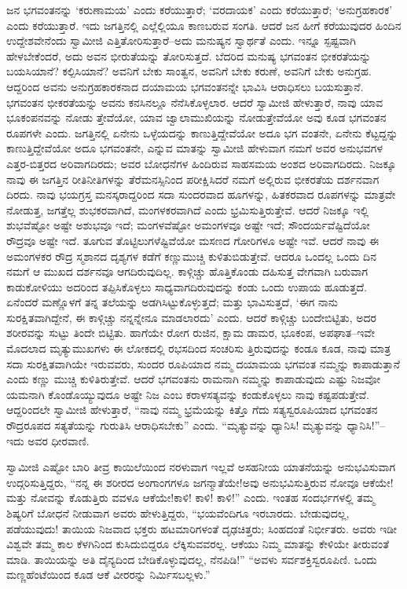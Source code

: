 ಜನ ಭಗವಂತನನ್ನು ‘ಕರುಣಾಮಯ’ ಎಂದು ಕರೆಯುತ್ತಾರೆ; ‘ವರದಾಯಕ’ ಎಂದು ಕರೆಯುತ್ತಾರೆ; ‘ಅನುಗ್ರಹಕಾರಕ’ ಎಂದು ಕರೆಯುತ್ತಾರೆ. ಇದು ಜಗತ್ತಿನಲ್ಲಿ ಎಲ್ಲೆಲ್ಲಿಯೂ ಕಾಣಬರುವ ಸಂಗತಿ. ಆದರೆ ಜನ ಹೀಗೆ ಕರೆಯುವುದರ ಹಿಂದಿನ ಉದ್ದೇಶವೇನೆಂದು ಸ್ವಾಮೀಜಿ ಎತ್ತಿತೋರಿಸುತ್ತಾರೆ–ಅದು ಮನುಷ್ಯನ ಸ್ವಾರ್ಥತೆ ಎಂದು. ಇನ್ನೂ ಸ್ಪಷ್ಟವಾಗಿ ಹೇಳಬೇಕೆಂದರೆ, ಅದು ಅವನ ಭೀರುತೆಯನ್ನು ತೋರಿಸುತ್ತದೆ. ಬೆದರಿದ ಮನುಷ್ಯ ಭಗವಂತನ ಭೀಕರತೆಯನ್ನು ಬಯಸಿಯಾನೆ? ಕಲ್ಪಿಸಿಯಾನೆ? ಅವನಿಗೆ ಬೇಕು ಸಾಂತ್ವನ, ಅವನಿಗೆ ಬೇಕು ಕರುಣೆ, ಅವನಿಗೆ ಬೇಕು ಅನುಗ್ರಹ. ಆದ್ದರಿಂದ ಅವನು ಅನುಗ್ರಹಕಾರಕನಾದ ದಯಾಮಯ ಭಗವಂತನನ್ನೇ ಭಾವಿಸಿ ಆರಾಧಿಸಲು ಬಯಸುತ್ತಾನೆ. ಭಗವಂತನ ಭೀಕರತೆಯನ್ನು ಅವನು ಕನಸಿನಲ್ಲೂ ನೆನೆಸಿಕೊಳ್ಳಲಾರ. ಆದರೆ ಸ್ವಾಮೀಜಿ ಹೇಳುತ್ತಾರೆ, ನಾವು ಯಾವ ಭೂಕಂಪನವನ್ನು ನೋಡು ತ್ತೇವೆಯೋ, ಯಾವ ಜ್ವಾಲಾಮುಖಿಯನ್ನು ನೋಡುತ್ತೇವೆಯೋ ಅವು ಕೂಡ ಭಗವಂತನ ರೂಪಗಳೇ ಎಂದು. ಜಗತ್ತಿನಲ್ಲಿ ಏನೇನು ಒಳ್ಳೆಯದನ್ನು ಕಾಣುತ್ತಿದ್ದೇವೆಯೋ ಅದೂ ಭಗ ವಂತನೇ, ಏನೇನು ಕೆಟ್ಟದ್ದನ್ನು ಕಾಣುತ್ತಿದ್ದೇವೆಯೋ ಅದೂ ಭಗವಂತನೇ, ಎನ್ನುವ ಮಾತನ್ನು ಸ್ವಾಮೀಜಿ ಹೇಳುವಾಗ ನಮಗೆ ಅವರ ಅನುಭವಗಳ ಎತ್ತರ-ಬಿತ್ತರದ ಅರಿವಾಗದಿರದು; ಅವರ ಬೋಧನೆಗಳ ಹಿಂದಿರುವ ಸಾಹಸಮಯ ಅಂಶದ ಅರಿವಾಗದಿರದು. ನಿಜಕ್ಕೂ ನಾವು ಈ ಜಗತ್ತಿನ ರೀತಿನೀತಿಗಳನ್ನು ತೆರೆಮನಸ್ಸಿನಿಂದ ಪರೀಕ್ಷಿಸಿದರೆ ನಮಗೆ ಅಲ್ಲಿರುವ ಭೀಕರತೆಯ ದರ್ಶನವಾಗ ದಿರದು. ನಾವು ಭಯಗ್ರಸ್ತ ಮನಸ್ಕರಾದ್ದರಿಂದ ಸದಾ ಸುಂದರವಾದ ಹೂಗಳನ್ನು, ಹಿತಕರವಾದ ರೂಪಗಳನ್ನು ಮಾತ್ರವೇ ನೋಡುತ್ತ, ಜಗತ್ತೆಲ್ಲ ಶುಭಕರವಾಗಿದೆ, ಮಂಗಳಕರವಾಗಿದೆ ಎಂದು ಭ್ರಮಿಸುತ್ತಿರುತ್ತೇವೆ. ಆದರೆ ನಿಜಕ್ಕೂ ಇಲ್ಲಿ ಶುಭವೆಷ್ಟೋ ಅಷ್ಟೇ ಅಶುಭವೂ ಇದೆ; ಮಂಗಳವೆಷ್ಟೋ ಅಮಂಗಳವೂ ಅಷ್ಟೇ ಇದೆ; ಸೌಂದರ್ಯವೆಷ್ಟಿದೆಯೋ ರೌದ್ರವೂ ಅಷ್ಟೇ ಇದೆ. ತೂಗುವ ತೊಟ್ಟಿಲುಗಳೆಷ್ಟಿವೆಯೋ ಮಸಣದ ಗೋರಿಗಳೂ ಅಷ್ಟೇ ಇವೆ. ಆದರೆ ನಾವು ಈ ಅಮಂಗಳಕರ ರೌದ್ರ ಸ್ಮಶಾನದ ದೃಶ್ಯಗಳ ಕಡೆಗೆ ಕಣ್ಣುಮುಚ್ಚಿ ಕುಳಿತುಬಿಡುತ್ತೇವೆ. ಆದರೂ ಒಂದಲ್ಲ ಒಂದು ದಿನ ನಮಗೆ ಆ ಮುಖದ ದರ್ಶನವೂ ಆಗದಿರುವುದಿಲ್ಲ. ಕಾಳ್ಗಿಚ್ಚು ಹೊತ್ತಿಕೊಂಡು ದಹಿಸುತ್ತ ವೇಗವಾಗಿ ಬರುವಾಗ ಕಾಡುಕೋಳಿಯು ಅದರಿಂದ ತಪ್ಪಿಸಿಕೊಳ್ಳಲು ಸಾಧ್ಯವಾಗದಿರುವುದನ್ನು ಕಂಡು ಒಂದು ಉಪಾಯ ಹೂಡುತ್ತದೆ. ಏನೆಂದರೆ ಮಣ್ಣೊಳಗೆ ತನ್ನ ತಲೆಯನ್ನು ಅಡಗಿಸಿಟ್ಟುಕೊಳ್ಳುತ್ತದೆ; ಮತ್ತು ಭಾವಿಸುತ್ತದೆ, ‘ಈಗ ನಾನು ಸುರಕ್ಷಿತವಾಗಿದ್ದೇನೆ, ಈ ಕಾಳ್ಗಿಚ್ಚು ನನ್ನನ್ನೇನೂ ಮಾಡಲಾರದು’ ಎಂದು. ಆದರೆ ಕಾಳ್ಗಿಚ್ಚು ಬಂದೇಬಿಟ್ಟಿತು, ಅದರ ಶರೀರವನ್ನು ಸುಟ್ಟು ತಿಂದೇ ಬಿಟ್ಟಿತು. ಹಾಗೆಯೇ ರೋಗ ರುಜಿನ, ಕ್ಷಾಮ ಡಾಮರ, ಭೂಕಂಪ, ಅಪಘಾತ–ಇವೇ ಮೊದಲಾದ ಮೃತ್ಯುಮುಖಗಳು ಈ ಲೋಕದಲ್ಲಿ ರಭಸದಿಂದ ಸಂಚರಿಸು ತ್ತಿರುವುದನ್ನು ಕಂಡೂ ಕೂಡ, ನಾವು ಮಾತ್ರ ಸದಾ ಸುರಕ್ಷಿತವಾಗಿಯೇ ಇರುವವರು, ಸುಂದರ ರೂಪಿಯಾದ ನಮ್ಮ ದಯಾಮಯ ಭಗವಂತ ನಮ್ಮನ್ನು ಕಾಪಾಡುತ್ತಾನೆ ಎಂದು ಕಣ್ಣು ಮುಚ್ಚಿ ಕುಳಿತಿರುತ್ತೇವೆ. ಆದರೆ ಭಗವಂತನು ರಾಮನಾಗಿ ನಮ್ಮನ್ನು ಕಾಪಾಡುವುದು ಎಷ್ಟು ನಿಜವೋ ಯಮನಾಗಿ ಕೊಂಡೊಯ್ಯುವುದೂ ಅಷ್ಟೇ ನಿಜ ಎಂಬ ಕರಾಳಸತ್ಯವನ್ನು ಕಂಡುಕೊಳ್ಳಲು ನಾವು ಕಷ್ಟಪಡುತ್ತೇವೆ. ಆದ್ದರಿಂದಲೇ ಸ್ವಾಮೀಜಿ ಹೇಳುತ್ತಾರೆ, “ನಾವು ನಮ್ಮ ಭ್ರಮೆಯನ್ನು ಕಿತ್ತೊ ಗೆದು ಸತ್ಯಸ್ವರೂಪಿಯಾದ ಭಗವಂತನ ರೌದ್ರರೂಪದ ಸತ್ಯತೆಯನ್ನು ಗುರುತಿಸಿ ಆರಾಧಿಸಬೇಕು” ಎಂದು. “ಮೃತ್ಯುವನ್ನು ಧ್ಯಾನಿಸಿ! ಮೃತ್ಯುವನ್ನು ಧ್ಯಾನಿಸಿ!”–ಇದು ಅವರ ಧೀರವಾಣಿ.

ಸ್ವಾಮೀಜಿ ಎಷ್ಟೋ ಬಾರಿ ತೀವ್ರ ಕಾಯಿಲೆಯಿಂದ ನರಳುವಾಗ ಇಲ್ಲವೆ ಅಸಹನೀಯ ಯಾತನೆಯನ್ನು ಅನುಭವಿಸುವಾಗ ಉದ್ಗರಿಸುತ್ತಿದ್ದರು, “ನನ್ನ ಈ ಶರೀರದ ಅಂಗಾಂಗಗಳೂ ಜಗನ್ಮಾತೆಯೇ!ಅವು ಅನುಭವಿಸುತ್ತಿರುವ ನೋವೂ ಆಕೆಯೇ! ಮತ್ತು ನೋವನ್ನು ಕೊಡುತ್ತಿರು ವವಳೂ ಆಕೆಯೇ!ಕಾಳಿ! ಕಾಳಿ! ಕಾಳಿ!” ಎಂದು. ಇಂತಹ ಸಂದರ್ಭಗಳಲ್ಲಿ ತಮ್ಮ ಶಿಷ್ಯರಿಗೆ ಬೋಧನೆ ನೀಡುವಾಗ ಅವರು ಹೇಳುತ್ತಿದ್ದರು, “ಭಯವೆಂದಿಗೂ ಇರಬಾರದು. ಬೇಡುವುದಲ್ಲ, ಪಡೆಯುವುದು! ತಾಯಿಯ ನಿಜವಾದ ಭಕ್ತರು ಹಟಮಾರಿಗಳಂತೆ ದೃಢಚಿತ್ತರು; ಸಿಂಹದಂತೆ ನಿರ್ಭೀತರು. ಅವರು ಇಡೀ ವಿಶ್ವವೇ ತಮ್ಮ ಕಾಲ ಕೆಳಗಿನಿಂದ ಕುಸಿದುಬಿದ್ದರೂ ಲೆಕ್ಕಿಸುವವರಲ್ಲ. ಆಕೆಯು ನಿಮ್ಮ ಮಾತನ್ನು ಕೇಳಿಯೇ ತೀರುವಂತೆ ಮಾಡಿ. ತಾಯಿಯನ್ನು ಅತಿ ದೈನ್ಯದಿಂದ ಬೇಡಿಕೊಳ್ಳುವುದಲ್ಲ, ನೆನಪಿಡಿ!” “ಅವಳು ಸರ್ವಶಕ್ತಿಸ್ವರೂಪಿಣಿ. ಒಂದು ಮಣ್ಣಹೆಂಟೆಯಿಂದ ಕೂಡ ಆಕೆ ವೀರರನ್ನು ನಿರ್ಮಿಸಬಲ್ಲಳು.”

